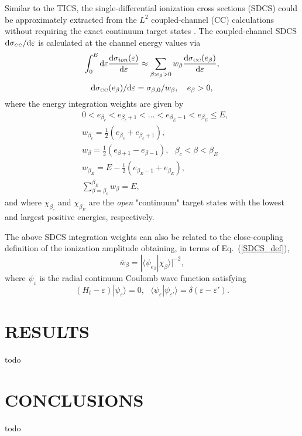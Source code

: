 \documentclass[aip,pra,showpacs,aps,twocolumn,groupedaddress,floatfix]{revtex4}
\newcommand{\beq}{\begin{equation}}
\newcommand{\eeq}{\end{equation}}
\newcommand{\dd}{\mbox{d}}
\newcommand{\vare}{\varepsilon}
\begin{document}
Similar to the TICS, the single-differential ionization cross sections (SDCS) could be approximately extracted from the $L^2$ coupled-channel (CC) calculations without requiring the exact continuum target states \cite{KBM94pL413}.  The coupled-channel SDCS
$\dd \sigma_{\mbox{{\tiny CC}}}/\dd \vare$
is calculated at the channel energy values via
\beq
\int_0^{E} \dd \vare \frac{\dd \sigma_{ion}(\vare)}{\dd \vare} \approx
\sum_{\beta : e_\beta > 0} w_\beta \frac{\dd \sigma_{\mbox{{\tiny CC}}}(e_\beta)}{\dd \vare},
\label{SDCS_def}
\eeq
\beq
\dd \sigma_{\mbox{{\tiny CC}}}(e_\beta) / \dd \vare= \sigma_{\beta, 0} / w_\beta,  \ \ \
e_{\beta} > 0,
\label{SDCS_from_w}
\eeq
where the energy integration weights are given by
\beq
\begin{array}{rl}
& 0 < e_{\beta_c} < e_{\beta_c+1} < ... <  e_{\beta_E-1} < e_{\beta_E} \le E,  \\
& w_{\beta_c}  = \frac{1}{2}(e_{\beta_c} + e_{\beta_c + 1} ), \\
& w_{\beta} = \frac{1}{2} (e_{\beta+1}  - e_{\beta-1}), \ \ \
\beta_c < \beta < \beta_E \\
& w_{\beta_E}  = E - \frac{1}{2}(e_{\beta_E-1} + e_{\beta_E} ), \\
& \sum_{\beta=\beta_c}^{\beta_E} w_{\beta} = E,
\end{array}
\label{w_ion}
\eeq
and where $\chi_{\beta_c}$ and $\chi_{\beta_E}$ are the {\em open} "continuum" target states with the lowest and largest positive energies, respectively.

The above SDCS integration weights can also be related to
the close-coupling definition of the ionization amplitude \cite{B02l}
obtaining, in terms of Eq.~(\ref{SDCS_def}),
\beq
\bar{w}_\beta= |\langle \psi_{e_\beta} | \chi_{\beta} \rangle|^{-2}  ,
\eeq
where $\psi_{\vare}$ is the radial continuum Coulomb wave function satisfying
\beq
(H_t - \vare ) | \psi_{\vare} \rangle = 0, \ \ \ \langle \psi_{\vare} | \psi_{\vare'} \rangle = \delta(\vare-\vare').
\eeq








\section{RESULTS}
todo

\section{CONCLUSIONS}



\begin{acknowledgments}
todo
\end{acknowledgments}




%
\end{document}
